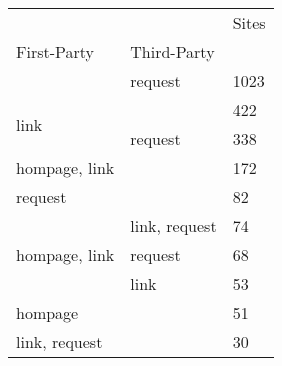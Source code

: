 \begin{tabular}{lll}
 &  & Sites \\
First-Party & Third-Party &  \\
 & request & 1023 \\
\multirow[c]{2}{*}{link} &  & 422 \\
 & request & 338 \\
hompage, link &  & 172 \\
request &  & 82 \\
 & link, request & 74 \\
hompage, link & request & 68 \\
 & link & 53 \\
hompage &  & 51 \\
link, request &  & 30 \\
\end{tabular}

